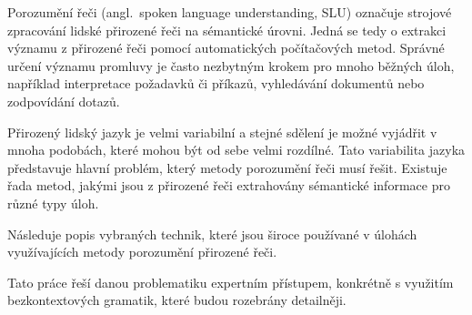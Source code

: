Porozumění řeči (angl.~spoken language understanding, SLU) označuje strojové zpracování lidské přirozené řeči na sémantické úrovni.
Jedná se tedy o extrakci významu z přirozené řeči pomocí automatických počítačových metod.
Správné určení významu promluvy je často nezbytným krokem pro mnoho běžných úloh, například interpretace požadavků či příkazů,
vyhledávání dokumentů nebo zodpovídání dotazů.~\cite{the_conversational_interface}

Přirozený lidský jazyk je velmi variabilní a stejné sdělení je možné vyjádřit v mnoha podobách, které mohou být od sebe velmi rozdílné.
Tato variabilita jazyka představuje hlavní problém, který metody porozumění řeči musí řešit.
Existuje řada metod, jakými jsou z přirozené řeči extrahovány sémantické informace pro různé typy úloh.

Následuje popis vybraných technik, které jsou široce používané v úlohách využívajících
metody porozumění přirozené řeči.~\cite{the_conversational_interface}

Tato práce řeší danou problematiku expertním přístupem, konkrétně s využitím bezkontextových gramatik, které budou rozebrány detailněji.

